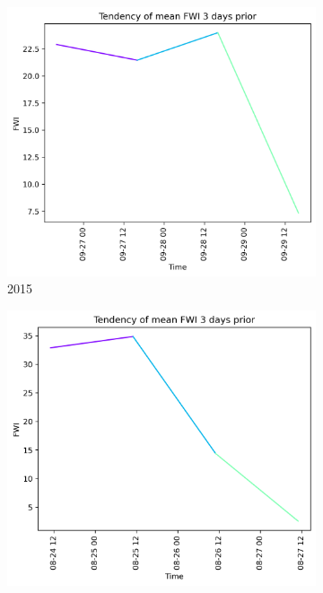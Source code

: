 \begin{figure}[h]
	\centering
	\caption{FWI values 3 days prior to wildfire}
	\begin{subfigure}{0.3\textwidth}
		\centering
		\includegraphics[width=\textwidth]{graphs/3days/2015_3daysprior_tendency_graph_FWI.png}
		\caption{2015}
		\label{fig:prior_3_days_2015}
	\end{subfigure}
	\hfill
	\begin{subfigure}{0.3\textwidth}
		\centering
		\includegraphics[width=\textwidth]{graphs/3days/2019_3daysprior_tendency_graph_FWI.png}

\end{subfigure}
\end{figure}
